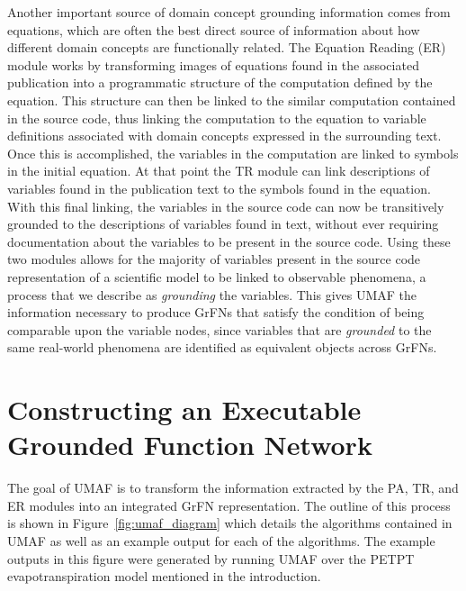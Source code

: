 Another important source of domain concept grounding information comes from equations, which are often the best direct source of information about how different domain concepts are functionally related.
The Equation Reading (ER) module works by transforming images of equations found in the associated publication into a programmatic structure of the computation defined by the equation.
This structure can then be linked to the similar computation contained in the source code, thus linking the computation to the equation to variable definitions associated with domain concepts expressed in the surrounding text.
Once this is accomplished, the variables in the computation are linked to symbols in the initial equation.
At that point the TR module can link descriptions of variables found in the publication text to the symbols found in the equation.
With this final linking, the variables in the source code can now be transitively grounded to the descriptions of variables found in text, without ever requiring documentation about the variables to be present in the source code.
Using these two modules allows for the majority of variables present in the source code representation of a scientific model to be linked to observable phenomena, a process that we describe as \textit{grounding} the variables.
This gives UMAF the information necessary to produce GrFNs that satisfy the condition of being comparable upon the variable nodes, since variables that are \textit{grounded} to the same real-world phenomena are identified as equivalent objects across GrFNs.

\section{Constructing an Executable Grounded Function Network \label{sec:grfn_assembly}}
The goal of UMAF is to transform the information extracted by the PA, TR, and ER modules into an integrated GrFN representation.
The outline of this process is shown in Figure~\ref{fig:umaf_diagram} which details the algorithms contained in UMAF as well as an example output for each of the algorithms.
The example outputs in this figure were generated by running UMAF over the PETPT evapotranspiration model mentioned in the introduction.

